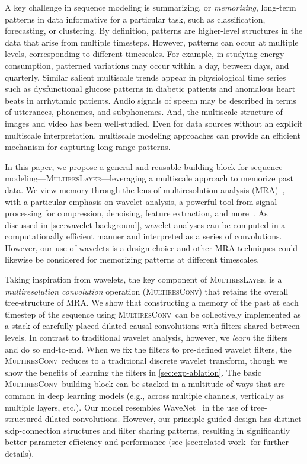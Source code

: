 \documentclass{article}
\theoremstyle{plain}
\theoremstyle{definition}
\theoremstyle{remark}
\newcommand{\ourlayer}{\textsc{MultiresLayer}}
\newcommand{\ourconv}{\textsc{MultiresConv}}
\begin{document}
A key challenge in sequence modeling is summarizing, or \emph{memorizing}, long-term patterns in data informative for a particular task, such as classification, forecasting, or clustering. By definition, patterns are higher-level structures in the data that arise from multiple timesteps.
However, patterns can occur at multiple levels, corresponding to different timescales.  For example, in studying energy consumption, patterned variations may occur within a day, between days, and quarterly. Similar salient multiscale trends appear in physiological time series such as dysfunctional glucose patterns in diabetic patients and anomalous heart beats in arrhythmic patients.  Audio signals of speech may be described in terms of utterances, phonemes, and subphonemes.  And, the multiscale structure of images and video has been well-studied.  Even for data sources without an explicit multiscale interpretation, multiscale modeling approaches can provide an efficient mechanism for capturing long-range patterns.  

In this paper, we propose a general and reusable building block for sequence modeling---\ourlayer---leveraging a multiscale approach to memorize past data.  
We view memory through the lens of multiresolution analysis (MRA)~\cite{willsky2002multiresolution}, with a particular emphasis on wavelet analysis, a powerful tool from signal processing for compression, denoising, feature extraction, and more~\cite{jawerth1994overview,akansu2001multiresolution}. As discussed in \cref{sec:wavelet-background}, wavelet analyses can be computed in a computationally efficient manner and interpreted as a series of convolutions. 
However, our use of wavelets is a design choice and other MRA techniques could likewise be considered for 
memorizing patterns at different timescales.

Taking inspiration from wavelets, the 
key component of \ourlayer\ is a \emph{multiresolution convolution} operation (\ourconv) that retains the overall tree-structure of MRA. 
We show that constructing a memory of the past at each timestep of the sequence using \ourconv\ can be collectively implemented as a stack of carefully-placed dilated causal convolutions with filters shared between levels. 
In contrast to traditional wavelet analysis, however, we \emph{learn} the filters and do so end-to-end. When we fix the filters to pre-defined wavelet filters, the \ourconv\ reduces to a traditional discrete wavelet transform, though we show the benefits of learning the filters in \cref{sec:exp-ablation}.  
The basic \ourconv\ building block can be stacked in a multitude of ways that are common in deep learning models (e.g., across multiple channels, vertically as multiple layers, etc.). 
Our model resembles WaveNet~\cite{oord2016wavenet} in the use of tree-structured dilated convolutions. 
However, our principle-guided design has distinct skip-connection structures and filter sharing patterns, resulting in significantly better parameter efficiency and performance (see \cref{sec:related-work} for further details). 
\end{document}
